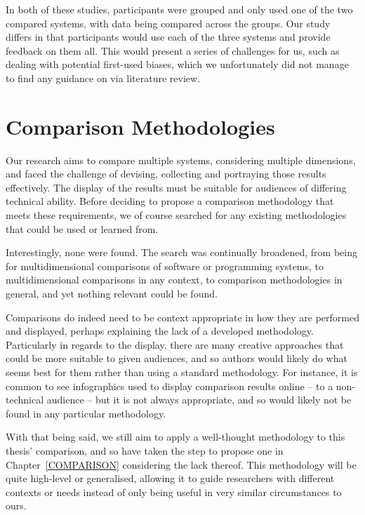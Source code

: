   In both of these studies, participants were grouped and only used one of the two compared systems, with data being compared across the groups. Our study differs in that participants would use each of the three systems and provide feedback on them all. This would present a series of challenges for us, such as dealing with potential first-used biases, which we unfortunately did not manage to find any guidance on via literature review.


\section{Comparison Methodologies}

  Our research aims to compare multiple systems, considering multiple dimensions, and faced the challenge of devising, collecting and portraying those results effectively. The display of the results must be suitable for audiences of differing technical ability. Before deciding to propose a comparison methodology that meets these requirements, we of course searched for any existing methodologies that could be used or learned from.

  Interestingly, none were found. The search was continually broadened, from being for multidimensional comparisons of software or programming systems, to multidimensional comparisons in any context, to comparison methodologies in general, and yet nothing relevant could be found.

  Comparisons do indeed need to be context appropriate in how they are performed and displayed, perhaps explaining the lack of a developed methodology. Particularly in regards to the display, there are many creative approaches that could be more suitable to given audiences, and so authors would likely do what seems best for them rather than using a standard methodology. For instance, it is common to see infographics used to display comparison results online -- to a non-technical audience -- but it is not always appropriate, and so would likely not be found in any particular methodology.
  
  With that being said, we still aim to apply a well-thought methodology to this thesis' comparison, and so have taken the step to propose one in Chapter~\ref{COMPARISON} considering the lack thereof. This methodology will be quite high-level or generalised, allowing it to guide researchers with different contexts or needs instead of only being useful in very similar circumstances to ours.



